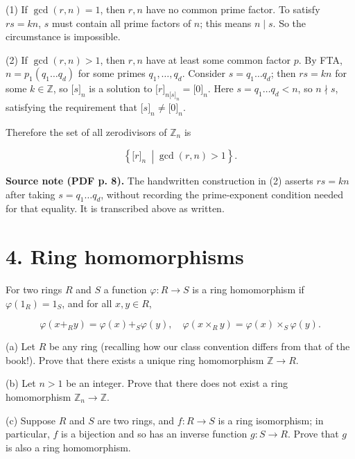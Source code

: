(1) If \(\gcd\left( {r,n} \right) = 1\), then \(r,n\) have no common prime factor. To satisfy \(rs = kn\), \(s\) must contain all prime factors of \(n\); this means \(n \mid s\). So the circumstance is impossible.

(2) If \(\gcd\left( {r,n} \right) > 1\), then \(r,n\) have at least some common factor \(p\). By FTA, \(n = p_{1}\left( {q_{1}\ldots q_{d}} \right)\) for some primes \(q_{1},\ldots,q_{d}\). Consider \(s = q_{1}\ldots q_{d}\); then \(rs = kn\) for some \(k \in \mathbb{Z}\), so \(\lbrack s\rbrack_{n}\) is a solution to \(\lbrack r\rbrack_{{n{\lbrack s\rbrack}}_{n}} = \lbrack 0\rbrack_{n}\). Here \(s = q_{1}\ldots q_{d} < n\), so \(n \nmid s\), satisfying the requirement that \(\lbrack s\rbrack_{n} \neq \lbrack 0\rbrack_{n}\).

Therefore the set of all zerodivisors of \(\mathbb{Z}_{n}\) is

\[\left\{ \lbrack r\rbrack_{n}\  \middle| \gcd\left( {r,n} \right) > 1 \right\}.\]

{\textbf{Source note (PDF p. 8).} The handwritten construction in (2) asserts \(rs = kn\) after taking \(s = q_{1}\ldots q_{d}\), without recording the prime-exponent condition needed for that equality. It is transcribed above as written.}

\section{4. Ring homomorphisms}

For two rings \(R\) and \(S\) a function \(\varphi:R\rightarrow S\) is a ring homomorphism if \(\varphi\left( 1_{R} \right) = 1_{S}\), and for all \(x,y \in R\),

\[\varphi\left( {x +_{R}y} \right) = \varphi(x) +_{S}\varphi(y),\quad\varphi\left( {x \times_{R}y} \right) = \varphi(x) \times_{S}\varphi(y).\]

(a) Let \(R\) be any ring (recalling how our class convention differs from that of the book!). Prove that there exists a unique ring homomorphism \(\mathbb{Z}\rightarrow R\).

(b) Let \(n > 1\) be an integer. Prove that there does not exist a ring homomorphism \(\mathbb{Z}_{n}\rightarrow\mathbb{Z}\).

(c) Suppose \(R\) and \(S\) are two rings, and \(f:R\rightarrow S\) is a ring isomorphism; in particular, \(f\) is a bijection and so has an inverse function \(g:S\rightarrow R\). Prove that \(g\) is also a ring homomorphism.

